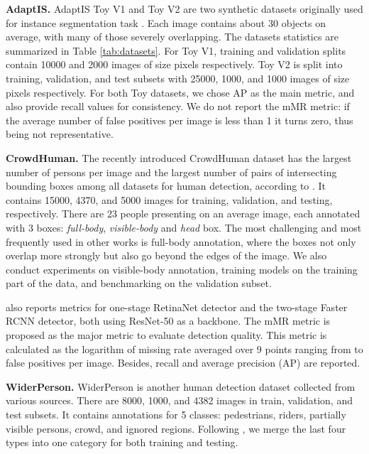 \documentclass[runningheads]{llncs}
\begin{document}
\textbf{AdaptIS.} AdaptIS Toy V1 and Toy V2 are two synthetic datasets originally used for instance segmentation task \cite{sofiiuk2019adaptis}. Each image contains about 30 objects on average, with many of those severely overlapping. The datasets statistics are summarized in Table \ref{tab:datasets}. For Toy V1, training and validation splits contain 10000 and 2000 images of size  pixels respectively. Toy V2 is split into training, validation, and test subsets with 25000, 1000, and 1000 images of size  pixels respectively. For both Toy datasets, we chose AP as the main metric, and also provide recall values for consistency. We do not report the mMR metric: if the average number of false positives per image is less than 1 it turns zero, thus being not representative.

\textbf{CrowdHuman.} The recently introduced CrowdHuman dataset has the largest number of persons per image and the largest number of pairs of intersecting bounding boxes among all datasets for human detection, according to \cite{shao2018crowdhuman}. It contains 15000, 4370, and 5000 images for training, validation, and testing, respectively. There are 23 people presenting on an average image, each annotated with 3 boxes: \emph{full-body}, \emph{visible-body} and \emph{head} box. The most challenging and most frequently used in other works is full-body annotation, where the boxes not only overlap more strongly but also go beyond the edges of the image. We also conduct experiments on visible-body annotation, training models on the training part of the data, and benchmarking on the validation subset.

\cite{shao2018crowdhuman} also reports metrics for one-stage RetinaNet detector and the two-stage Faster RCNN detector, both using ResNet-50 as a backbone. The mMR metric is proposed as the major metric to evaluate detection quality. This metric is calculated as the logarithm of missing rate averaged over 9 points ranging from  to  false positives per image. Besides, recall and average precision (AP) are reported.

\textbf{WiderPerson.} WiderPerson \cite{zhang2019widerperson} is another human detection dataset collected from various sources. There are 8000, 1000, and 4382 images in train, validation, and test subsets. It contains annotations for 5 classes: pedestrians, riders, partially visible persons, crowd, and ignored regions. Following \cite{ge2020ps}, we merge the last four types into one category for both training and testing.
\end{document}
